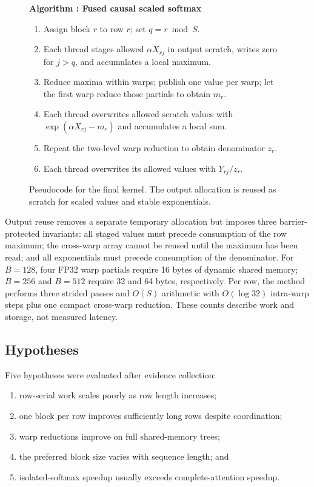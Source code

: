 \documentclass[twoside,twocolumn,10pt]{article}
\newcounter{algorithm}
\begin{document}
\begin{figure}[t]
\centering
\begin{minipage}{0.97\columnwidth}
\small
{}\textbf{Algorithm \thealgorithm: Fused causal
scaled softmax}\label{alg:fused}
\begin{enumerate}
\setlength{\itemsep}{0pt}
\setlength{\parsep}{0pt}
\item Assign block $r$ to row $r$; set $q=r\bmod S$.
\item Each thread stages allowed $\alpha X_{rj}$ in output scratch, writes zero
for $j>q$, and accumulates a local maximum.
\item Reduce maxima within warps; publish one value per warp; let the first
warp reduce those partials to obtain $m_r$.
\item Each thread overwrites allowed scratch values with
$\exp(\alpha X_{rj}-m_r)$ and accumulates a local sum.
\item Repeat the two-level warp reduction to obtain denominator $z_r$.
\item Each thread overwrites its allowed values with $Y_{rj}/z_r$.
\end{enumerate}
\end{minipage}
\caption*{Pseudocode for the final kernel. The output allocation is reused as
scratch for scaled values and stable exponentials.}
\end{figure}

Output reuse removes a separate temporary allocation but imposes three
barrier-protected invariants: all staged values must precede consumption of the
row maximum; the cross-warp array cannot be reused until the maximum has been
read; and all exponentials must precede consumption of the denominator. For
$B=128$, four FP32 warp partials require 16 bytes of dynamic shared memory;
$B=256$ and $B=512$ require 32 and 64 bytes, respectively. Per row, the method
performs three strided passes and $O(S)$ arithmetic with $O(\log 32)$
intra-warp steps plus one compact cross-warp reduction. These counts describe
work and storage, not measured latency.

\subsection{Hypotheses}

Five hypotheses were evaluated after evidence collection:

\begin{enumerate}
\item row-serial work scales poorly as row length increases;
\item one block per row improves sufficiently long rows despite coordination;
\item warp reductions improve on full shared-memory trees;
\item the preferred block size varies with sequence length; and
\item isolated-softmax speedup usually exceeds complete-attention speedup.
\end{enumerate}
\end{document}
